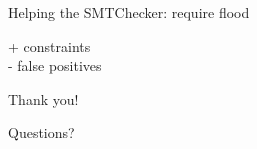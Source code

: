 \documentclass[aspectratio=169,10pt]{beamer}
\begin{document}
\begin{frame}[fragile]{Helping the SMTChecker: require flood}
\begin{center}
+ constraints\\
- false positives
\end{center}
\end{frame}

\begin{frame}
\begin{center}
Thank you!
\end{center}
\end{frame}
 
\begin{frame}
\begin{center}
Questions?
\end{center}
\end{frame}
 
\end{document}
